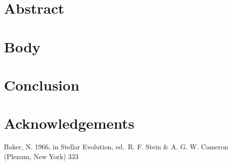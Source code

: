 \documentclass[conf]{new-aiaa}
\begin{document}
\maketitle
\begin{abstract}

\end{abstract}

\newpage




\section{Abstract}

\section{Body}

\section{Conclusion}

\section{Acknowledgements}
\newpage

\begin{thebibliography}{}

 Baker, N. 1966,
    in Stellar Evolution,
    ed.\ R. F. Stein \& A. G. W. Cameron
    (Plenum, New York) 333

\end{thebibliography}

\newpage
\end{document}
